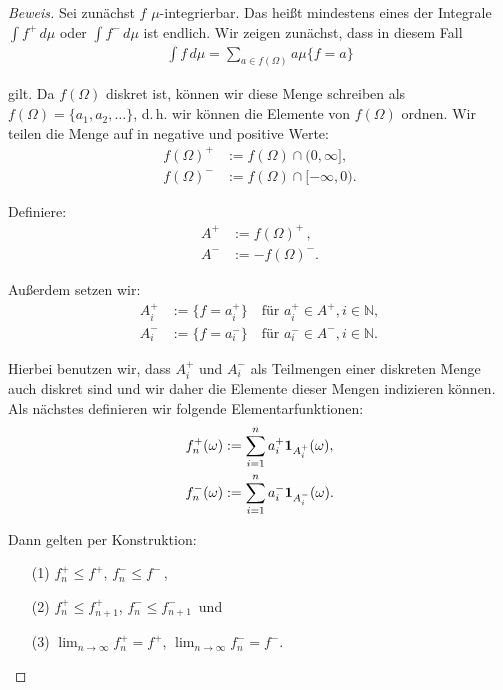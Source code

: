 \documentclass[10pt]{article}
\newcommand{\N}{\mathbb{N}}
\begin{document}
\begin{proof}[Beweis]
  Sei zunächst $f$ $\mu$-integrierbar. Das heißt mindestens eines der Integrale 
  $\int f^{+} \,d\mu$ oder $\int f^{-} \,d\mu$ ist endlich.
  Wir zeigen zunächst, dass in diesem Fall
  \begin{align*}
    \int f \,d\mu = \sum_{a\in f(\Omega)} a\mu\{f=a\}
  \end{align*}

  gilt. Da $f(\Omega)$ diskret ist, können wir diese Menge schreiben als 
  $f(\Omega) = \{ a_1,a_2,\dots \}$, d.\,h. wir können die Elemente von $f(\Omega)$  
  ordnen. Wir teilen die Menge auf in negative und positive Werte:
  \begin{align*}
    f(\Omega)^{+} &:= f(\Omega)\cap(0,\infty], \\
    f(\Omega)^{-} &:= f(\Omega)\cap[-\infty,0).
  \end{align*}
  
  Definiere:
  \begin{align*}
    A^{+} &:= f(\Omega)^{+} \,,  \\
    A^{-} &:= -f(\Omega)^{-}.
  \end{align*}

  Außerdem setzen wir:
  \begin{align*}
    A_i^{+} &:= \{ f = a_i^+ \} \quad\text{für $a_i^+\in A^+, i\in\N$}, \\
    A_i^{-} &:= \{ f = a_i^- \} \quad\text{für $a_i^-\in A^-, i\in\N$}.
  \end{align*}

  Hierbei benutzen wir, dass $A_i^{+}$ und $A_i^{-}$ als Teilmengen einer diskreten Menge 
  auch diskret sind und wir daher die Elemente dieser Mengen indizieren können.  
  Als nächstes definieren wir folgende Elementarfunktionen:
  \begin{align*}
      f^{+}_n(\omega) &:= \sum_{i=1}^{n} a_i^+ \text{\textbf{1}}_{A^{+}_i}(\omega), \\                                                               
      f^{-}_n(\omega) &:= \sum_{i=1}^{n} a_i^- \text{\textbf{1}}_{A^{-}_i}(\omega).                                   
  \end{align*}

  Dann gelten per Konstruktion:
  \begin{itemize}
    \item[(1)] $f_n^+ \leq f^{+}$, $f_n^- \leq f^{-}$\,,
    \item[(2)] $f_n^+ \leq f_{n+1}^+$, $f_n^- \leq f_{n+1}^-$\, und
    \item[(3)] $\lim_{n\to\infty} f_n^{+} = f^{+}$, $\lim_{n\to\infty} f_n^{-} = f^{-}$.
  \end{itemize}


\end{proof}
\end{document}
